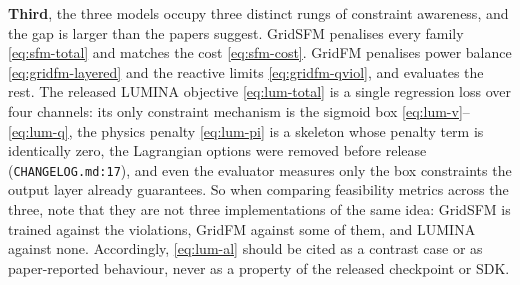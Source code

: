 \documentclass[11pt]{article}
\newcommand{\code}[1]{\texttt{\small #1}}
\begin{document}
\textbf{Third}, the three models occupy three distinct rungs of constraint awareness, and
the gap is larger than the papers suggest. GridSFM penalises every family
\eqref{eq:sfm-total} and matches the cost \eqref{eq:sfm-cost}. GridFM penalises power
balance \eqref{eq:gridfm-layered} and the reactive limits \eqref{eq:gridfm-qviol}, and
evaluates the rest. The released LUMINA objective \eqref{eq:lum-total} is a single
regression loss over four channels: its only constraint mechanism is the sigmoid box
\eqref{eq:lum-v}--\eqref{eq:lum-q}, the physics penalty \eqref{eq:lum-pi} is a skeleton
whose penalty term is identically zero, the Lagrangian options were removed before release
(\code{CHANGELOG.md:17}), and even the evaluator measures only the box constraints the
output layer already guarantees. So when comparing feasibility metrics across the three,
note that they are not three implementations of the same idea: GridSFM is trained against
the violations, GridFM against some of them, and LUMINA against none. Accordingly,
\eqref{eq:lum-al} should be cited as a contrast case or as paper-reported behaviour, never
as a property of the released checkpoint or SDK.
\end{document}
